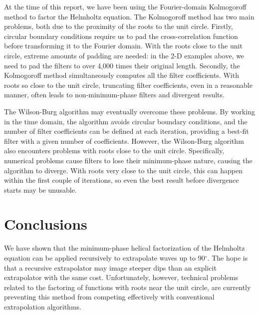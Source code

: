 \par
At the time of this report, we have been using the Fourier-domain
Kolmogoroff method \cite{kolmog, Claerbout.sep.97.jon1} to factor the
Helmholtz equation.   
The Kolmogoroff method has two main problems, both due to the
proximity of the roots to the unit circle. Firstly, circular boundary
conditions require us to pad the cross-correlation function before
transforming it to the Fourier domain. With the roots close to the
unit circle, extreme amounts of padding are needed: in the 2-D
examples above, we need to pad the filters to over 4,000 times their
original length.  
Secondly, the Kolmogoroff method simultaneously computes all the
filter coefficients. With roots so close to the unit circle,
truncating filter coefficients, even in a reasonable manner, often
leads to non-minimum-phase filters and divergent results. 

\par
The Wilson-Burg algorithm \cite{wilson, Sava.sep.97.paul1} may 
eventually overcome these problems. By working in the time domain, the
algorithm avoids circular boundary conditions, and the number of
filter coefficients can be defined at each iteration, providing a
best-fit filter with a given number of coefficients.
However, the Wilson-Burg algorithm also encounters problems with roots
close to the unit circle.  Specifically, numerical problems cause
filters to lose their minimum-phase nature, causing the algorithm to
diverge.  With roots very close to the unit circle, this can happen
within the first couple of iterations, so even the best result before
divergence starts may be unusable.

\section{Conclusions}
We have shown that the minimum-phase helical factorization of the
Helmholtz equation can be applied recursively to extrapolate waves up
to 90$^\circ$. The hope is that a recursive extrapolator may image
steeper dips than an explicit extrapolator with the same cost. 
Unfortunately, however, technical problems related to
the factoring of functions with roots near the unit circle, are
currently preventing this method from competing effectively with 
conventional extrapolation algorithms.







